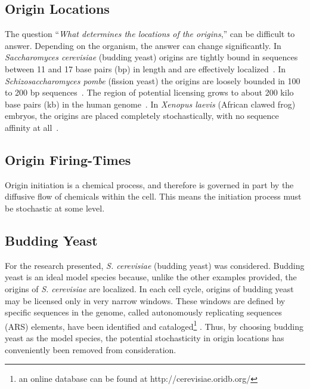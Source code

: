 	
		\subsection{Origin Locations}
		\label{subsec:OriginLocations}
		
		The question ``\emph{What determines the locations of the origins},'' can be difficult to answer.
		Depending on the organism, the answer can change significantly.
		In \emph{Saccharomyces cerevisiae} (budding yeast) origins are tightly bound in sequences between 11 and 17 base pairs (bp) in length and are effectively localized~\cite{ScottsPaper}.
		In \emph{Schizosaccharomyces pombe} (fission yeast) the origins are loosely bounded in 100 to 200 bp sequences~\cite{OriginsReview}.
		The region of potential licensing grows to about 200 kilo base pairs (kb) in the human genome~\cite{HumanGenome}.
		In \emph{Xenopus laevis} (African clawed frog) embryos, the origins are placed completely stochastically, with no sequence affinity at all~\cite{FrogEmbryo}.
		
		
		\subsection{Origin Firing-Times}
		\label{subsec:OriginTimes}
		
		Origin initiation is a chemical process, and therefore is governed in part by the diffusive flow of chemicals within the cell.
		This means the initiation process must be stochastic at some level.
		
		
		\subsection{Budding Yeast}
		\label{subsec:BuddingYeast}
		
		For the research presented, \emph{S. cerevisiae} (budding yeast) was considered.
		Budding yeast is an ideal model species because, unlike the other examples provided, the origins of \emph{S. cerevisiae} are localized.
		In each cell cycle, origins of budding yeast may be licensed only in very narrow windows.
		These windows are defined by specific sequences in the genome, called autonomously replicating sequences (ARS) elements, have been identified and cataloged\footnote{an online database can be found at http://cerevisiae.oridb.org/} \cite{OriDB}.
		Thus, by choosing budding yeast as the model species, the potential stochasticity in origin locations has conveniently been removed from consideration.
		
